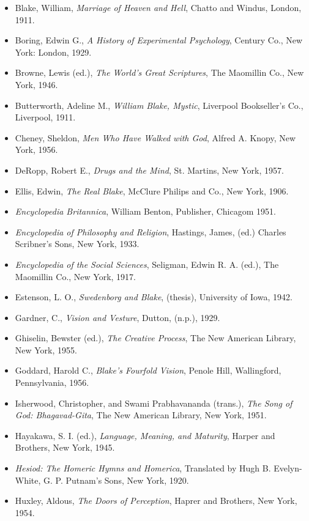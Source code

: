 \begin{itemize}
	\item Blake, William, \textit{Marriage of Heaven and Hell}, Chatto and Windus, London, 1911.
	\item Boring, Edwin G., \textit{A History of Experimental Psychology}, Century Co., New York: London, 1929.
	\item Browne, Lewis (ed.), \textit{The World's Great Scriptures}, The Maomillin Co., New York, 1946.
	\item Butterworth, Adeline M., \textit{William Blake, Mystic}, Liverpool Bookseller's Co., Liverpool, 1911.
	\item Cheney, Sheldon, \textit{Men Who Have Walked with God}, Alfred A. Knopy, New York, 1956.
	\item DeRopp, Robert E., \textit{Drugs and the Mind}, St. Martins, New York, 1957.
	\item Ellis, Edwin, \textit{The Real Blake}, McClure Philips and Co., New York, 1906.
	\item \textit{Encyclopedia Britannica}, William Benton, Publisher, Chicagom 1951.
	\item \textit{Encyclopedia of Philosophy and Religion}, Hastings, James, (ed.) Charles Scribner's Sons, New York, 1933.
	\item \textit{Encyclopedia of the Social Sciences}, Seligman, Edwin R. A. (ed.), The Maomillin Co., New York, 1917.
	\item Estenson, L. O., \textit{Swedenborg and Blake}, (thesis), University of Iowa, 1942.
	\item Gardner, C., \textit{Vision and Vesture}, Dutton, (n.p.), 1929.
	\item Ghiselin, Bewster (ed.), \textit{The Creative Process}, The New American Library, New York, 1955.
	\item Goddard, Harold C., \textit{Blake's Fourfold Vision}, Penole Hill, Wallingford, Pennsylvania, 1956.
	\item Isherwood, Christopher, and Swami Prabhavananda (trans.), \textit{The Song of God: Bhagavad-Gita}, The New American Library, New York, 1951.
	\item Hayakawa, S. I. (ed.), \textit{Language, Meaning, and Maturity}, Harper and Brothers, New York, 1945.
	\item \textit{Hesiod: The Homeric Hymns and Homerica}, Translated by Hugh B. Evelyn-White, G. P. Putnam's Sons, New York, 1920.
	\item Huxley, Aldous, \textit{The Doors of Perception}, Haprer and Brothers, New York, 1954.

\end{itemize}
